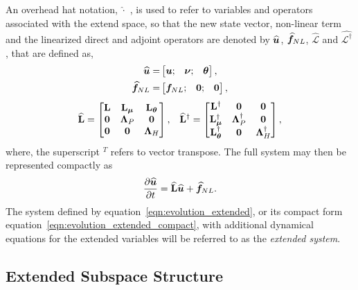 An overhead hat notation, $\widehat{\cdot}$ , is used to refer to variables and operators associated with the extend space, so that the new state vector, non-linear term and the linearized direct and adjoint operators are denoted by ${\widehat{\boldsymbol{u}}}$, ${\widehat{\boldsymbol{f}}}_{NL}$, $\widehat{\mathcal{L}}$ and $\widehat{\mathcal{L}^{\dagger}}$, that are defined as,
\begin{align}
	{\widehat{ \boldsymbol{u} }} =& \begin{bmatrix}
		\boldsymbol{u}; &
		\boldsymbol{\nu}; &
		\boldsymbol{\theta}
	\end{bmatrix}, \nonumber \\
	{\widehat{\boldsymbol{f}}}_{NL} =& \begin{bmatrix}
		\boldsymbol{f}_{NL}; &
		\boldsymbol{0};	&
		\boldsymbol{0}
	\end{bmatrix}, \nonumber
\end{align}
%
\begin{align}
	\label{eqn:linearized_operator_extended}
	\mathbf{\widehat{L}} =
	\begin{bmatrix}
		\mathbf{L} & \mathbf{L}_{\boldsymbol{\mu}} & \mathbf{L}_{\boldsymbol{\theta}} \\
		\mathbf{0} 	& \mathbf{\Lambda}_{P} & \mathbf{0} \\
		\mathbf{0} 	& \mathbf{0} &  \mathbf{\Lambda}_{H}
	\end{bmatrix},	
	&&
	\mathbf{\widehat{L}}^{\dagger} =
	\begin{bmatrix}
		\mathbf{L}^{\dagger} 		   & \mathbf{0} & \mathbf{0} \\
		\mathbf{L}_{\boldsymbol{\mu}}^{\dagger}	 	& \mathbf{\Lambda}^{\dagger}_{P} & \mathbf{0} \\
		\mathbf{L}_{\boldsymbol{\theta}}^{\dagger}  & \mathbf{0} & \mathbf{\Lambda}^{\dagger}_{H} \\
	\end{bmatrix},
\end{align}
where, the superscript $^{T}$ refers to vector transpose.
The full system may then be represented compactly as
\begin{equation}
	\label{eqn:evolution_extended_compact}
	\dfrac{\partial {\widehat{ \boldsymbol{u} }}}{\partial t} =
	\mathbf{\widehat{L}}{\widehat{\boldsymbol{u}}}  + {\widehat{\boldsymbol{f}}}_{NL}.
\end{equation}
The system defined by equation~\eqref{eqn:evolution_extended}, or its compact form equation~\eqref{eqn:evolution_extended_compact}, with additional dynamical equations for the extended variables will be referred to as the \emph{extended system}. 

\subsection{Extended Subspace Structure}
\label{sec:extended_subspace_structure}

